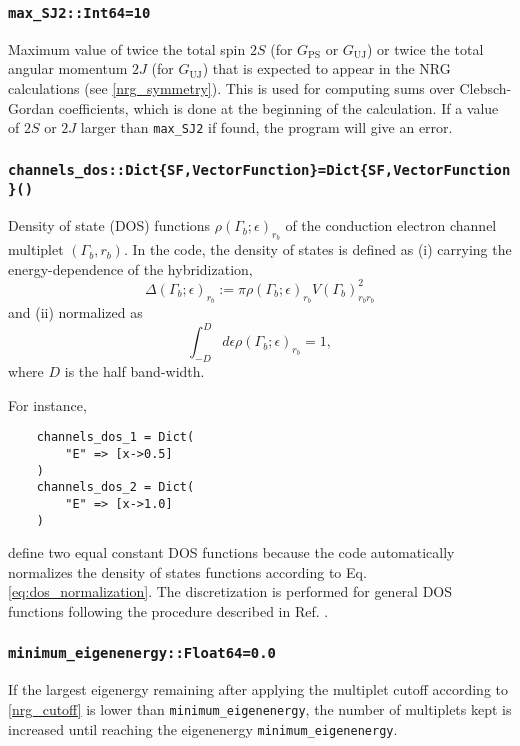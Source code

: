\documentclass[notitlepage]{article}
\begin{document}
\subsubsection{\texttt{max\_SJ2::Int64=10}}
\label{nrg_maxsj2}
Maximum value of twice the total spin $2S$ (for
$G_\text{PS}$ or $G_\text{UJ}$) or twice the total angular
momentum $2J$ (for $G_\text{UJ}$) that is expected to appear in
the NRG calculations (see \ref{nrg_symmetry}). This is used
for computing sums over Clebsch-Gordan coefficients, which
is done at the beginning of the calculation. If a value of
$2S$ or $2J$ larger than \texttt{max\_SJ2} if found, the
program will give an error.

\subsubsection{\texttt{channels\_dos::Dict\{SF,Vector{Function}\}=Dict\{SF,Vector{Function}\}()}}
\label{nrg_channelsdos}
Density of state (DOS) functions $\rho(\Gamma_b;\epsilon)_{r_b}$ of the
conduction electron channel multiplet $(\Gamma_b,r_b)$. In
the code, the density of states is defined as (i) carrying the
energy-dependence of the hybridization,
\begin{equation}
    \Delta(\Gamma_b;\epsilon)_{r_b}
    :=
    \pi
    \rho(\Gamma_b;\epsilon)_{r_b}
    V(\Gamma_b)_{r_b r_b}^2
\end{equation}
and (ii) normalized as
\begin{equation}
    \int_{-D}^D d\epsilon \rho(\Gamma_b;\epsilon)_{r_b} = 1,
    \label{eq:dos_normalization}
\end{equation}
where $D$ is the half band-width.
\par
For instance,
\begin{verbatim}
    channels_dos_1 = Dict(
        "E" => [x->0.5]
    )
    channels_dos_2 = Dict(
        "E" => [x->1.0]
    )
\end{verbatim}
define two equal constant DOS functions because the code
automatically normalizes the density of states functions
according to Eq. \ref{eq:dos_normalization}. The
discretization is performed for general DOS functions
following the procedure described in Ref. \cite{chen1995}.


\subsubsection{\texttt{minimum\_eigenenergy::Float64=0.0}}
\label{nrg_minimumeigenenergy}
If the largest eigenergy remaining after applying the
multiplet cutoff according to \ref{nrg_cutoff} is lower than
\texttt{minimum\_eigenenergy}, the number of multiplets kept
is increased until reaching the eigenenergy
\texttt{minimum\_eigenenergy}.
\end{document}
